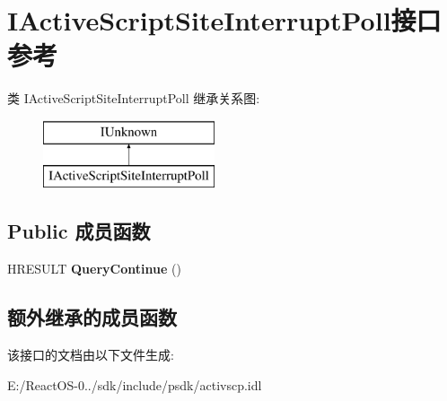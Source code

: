 \hypertarget{interface_i_active_script_site_interrupt_poll}{}\section{I\+Active\+Script\+Site\+Interrupt\+Poll接口 参考}
\label{interface_i_active_script_site_interrupt_poll}
类 I\+Active\+Script\+Site\+Interrupt\+Poll 继承关系图\+:\begin{figure}[H]
\begin{center}
\leavevmode
\includegraphics[height=2.000000cm]{interface_i_active_script_site_interrupt_poll}
\end{center}
\end{figure}
\subsection*{Public 成员函数}
\begin{DoxyCompactItemize}
\item 
\mbox{\label{interface_i_active_script_site_interrupt_poll_a2202a47c385699fc09630641ccf66566}} 
H\+R\+E\+S\+U\+LT {\bfseries Query\+Continue} ()
\end{DoxyCompactItemize}
\subsection*{额外继承的成员函数}


该接口的文档由以下文件生成\+:\begin{DoxyCompactItemize}
\item 
E\+:/\+React\+O\+S-\/0../sdk/include/psdk/activscp.\+idl\end{DoxyCompactItemize}

